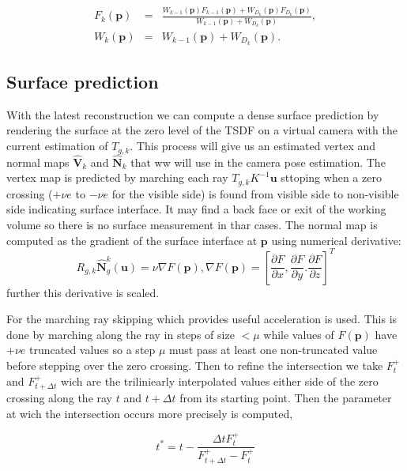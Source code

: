 \begin{eqnarray*}
 F_k(\mathbf{p}) &=& \frac{W_{k-1}(\mathbf{p}) F_{k-1}(\mathbf{p}) + W_{D_{k}}(\mathbf{p}) F_{D_{k}}(\mathbf{p}) }{ W_{k-1}(\mathbf{p}) + W_{D_{k}}(\mathbf{p}) }, \\
 W_k(\mathbf{p}) &=& W_{k-1}(\mathbf{p}) + W_{D_{k}}(\mathbf{p}).
\end{eqnarray*}

\subsection{Surface prediction}
With the latest reconstruction we can compute a dense surface prediction by rendering the surface at the zero level of the TSDF on a virtual camera with the current estimation of $T_{g,k}$. This process will give us an estimated vertex and normal maps $\hat{\mathbf{V}}_k$ and $\hat{\mathbf{N}}_k$ that ww will use in the camera pose estimation.
The vertex map is predicted by marching each ray $T_{g,k}K^{-1}\mathbf{u}$ sttoping when a zero crossing ($+\nu e$ to $-\nu e$ for the visible side) is found from visible side to non-visible side indicating surface interface.
It may find a back face or exit of the working volume so there is no surface measurement in thar cases.
The normal map is computed as the gradient of the surface interface at $\mathbf{p}$ using numerical derivative:
\begin{equation}
 R_{g,k} \hat{\mathbf{N}}_g^k(\mathbf{u}) = \nu \nabla F(\mathbf{p}), \nabla F(\mathbf{p}) = \left [ \frac{\partial F}{\partial x}, \frac{\partial F}{\partial y}. \frac{\partial F}{\partial z} \right ]^T
\end{equation}
further this derivative is scaled.

For the marching ray skipping which provides useful acceleration is used. This is done by marching along the ray in steps of size $< \mu$ while values of $F(\mathbf{p})$ have $+ \nu e$ truncated values so a step $\mu$ must pass at least one non-truncated value before stepping over the zero crossing.
Then to refine the intersection we take $F^+_t$ and $F^+_{t+\Delta t}$ wich are the triliniearly interpolated values either side of the zero crossing along the ray $t$ and $t+\Delta t$ from its starting point.
Then the parameter at wich the intersection occurs more precisely is computed,

\begin{equation}
t^* = t - \frac{\Delta t F^+_t}{F^+_{t+\Delta t} - F^+_t}
\end{equation}

